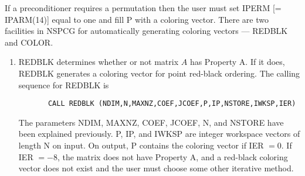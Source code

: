 If a preconditioner requires a permutation then the user must set 
IPERM [= IPARM(14)] equal to one and fill P with a coloring vector.  
There are two facilities in NSPCG for automatically generating coloring 
vectors --- REDBLK and COLOR.
\begin{enumerate}
  \item
       REDBLK determines whether or not matrix $A$ has Property A.
       If it does, REDBLK generates a coloring vector for point
       red-black ordering.  The calling sequence for REDBLK is
       \begin{verbatim}
       CALL REDBLK (NDIM,N,MAXNZ,COEF,JCOEF,P,IP,NSTORE,IWKSP,IER)   
       \end{verbatim}
       The parameters NDIM, MAXNZ, COEF, JCOEF, N, and NSTORE
       have been explained previously.  P, IP, and IWKSP are integer
       workspace vectors of length N on input.  On output, P
       contains the coloring vector if IER $=0$.  If IER $=-8$,
       the matrix does not have Property A, and a red-black
       coloring vector does not exist and the user must choose
       some other iterative method.
 

\end{enumerate}
